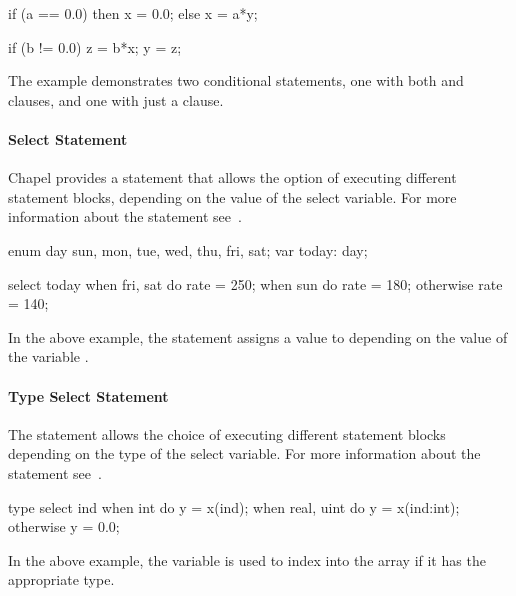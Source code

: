 \begin{example}
\begin{chapel}
if (a == 0.0) then 
  x = 0.0;
else 
  x = a*y;

if (b != 0.0) {
  z = b*x;
  y = z; 
}
\end{chapel}
The example demonstrates two conditional statements, one with
both  and  clauses, and one with just a
 clause.
\end{example}

\paragraph{Select Statement} 
Chapel provides a  statement that allows the option of
executing different statement blocks, depending on the value of the
select variable.  For more information about the 
statement see~.

\begin{example}
\begin{chapel}
enum day {sun, mon, tue, wed, thu, fri, sat};
var today: day;

select today {
  when fri, sat do rate = 250;
  when sun do rate = 180;
  otherwise rate = 140;
}
\end{chapel}
In the above example, the  statement assigns
a value to  depending on the value of the 
variable .
\end{example}

\paragraph{Type Select Statement} 
The  statement allows the choice of
executing different statement blocks depending on the type
of the select variable.  For more information about the
 statement see~.

\begin{example}
\begin{chapel}
type select ind {
  when int do y = x(ind);
  when real, uint do y = x(ind:int);
  otherwise y = 0.0;
}
\end{chapel}
In the above example, the variable  is used
to index into the array  if it has the appropriate
type.
\end{example}

